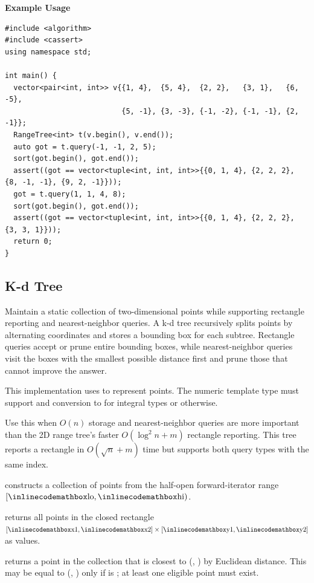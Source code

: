 \textbf{Example Usage}\par
\begin{lstlisting}[style=cpp]
#include <algorithm>
#include <cassert>
using namespace std;

int main() {
  vector<pair<int, int>> v{{1, 4},  {5, 4},  {2, 2},   {3, 1},   {6, -5},
                           {5, -1}, {3, -3}, {-1, -2}, {-1, -1}, {2, -1}};
  RangeTree<int> t(v.begin(), v.end());
  auto got = t.query(-1, -1, 2, 5);
  sort(got.begin(), got.end());
  assert((got == vector<tuple<int, int, int>>{{0, 1, 4}, {2, 2, 2}, {8, -1, -1}, {9, 2, -1}}));
  got = t.query(1, 1, 4, 8);
  sort(got.begin(), got.end());
  assert((got == vector<tuple<int, int, int>>{{0, 1, 4}, {2, 2, 2}, {3, 3, 1}}));
  return 0;
}
\end{lstlisting}
\subsection{K-d Tree}
\label{sec:2.6.4}
Maintain a static collection of two-dimensional points while supporting rectangle reporting and nearest-neighbor queries. A k-d tree recursively splits points by alternating coordinates and stores a bounding box for each subtree. Rectangle queries accept or prune entire bounding boxes, while nearest-neighbor queries visit the boxes with the smallest possible distance first and prune those that cannot improve the answer.

This implementation uses  to represent points. The numeric template type must support  and conversion to  for integral types or  otherwise.

Use this when $O(n)$ storage and nearest-neighbor queries are more important than the 2D range tree's faster $O(\log^{2} n + m)$ rectangle reporting. This tree reports a rectangle in $O(\sqrt{n} + m)$ time but supports both query types with the same index.

\begin{compactitem}
  \item {} constructs a collection of  points from the half-open forward-iterator range $[{\inlinecodemath{lo}}, {\inlinecodemath{hi}})$.
  \item {} returns all points in the closed rectangle $[{\inlinecodemath{x1}}, {\inlinecodemath{x2}}] \times [{\inlinecodemath{y1}}, {\inlinecodemath{y2}}]$ as  values.
  \item {} returns a point in the collection that is closest to (, ) by Euclidean distance. This may be equal to (, ) only if  is ; at least one eligible point must exist.
\end{compactitem}

